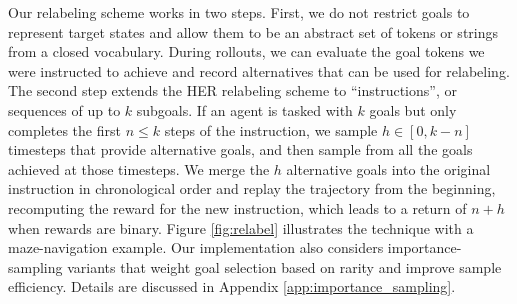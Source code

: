 Our relabeling scheme works in two steps. First, we do not restrict goals to represent target states and allow them to be an abstract set of tokens or strings from a closed vocabulary. During rollouts, we can evaluate the goal tokens we were instructed to achieve and record alternatives that can be used for relabeling. The second step extends the HER relabeling scheme to ``instructions'', or sequences of up to $k$ subgoals. If an agent is tasked with $k$ goals but only completes the first $n \leq k$ steps of the instruction, we sample $h \in [0, k-n]$ timesteps that provide alternative goals, and then sample from all the goals achieved at those timesteps. We merge the $h$ alternative goals into the original instruction in chronological order and replay the trajectory from the beginning, recomputing the reward for the new instruction, which leads to a return of $n + h$ when rewards are binary. Figure \ref{fig:relabel} illustrates the technique with a maze-navigation example. Our implementation also considers importance-sampling variants that weight goal selection based on rarity and improve sample efficiency. Details are discussed in Appendix \ref{app:importance_sampling}.